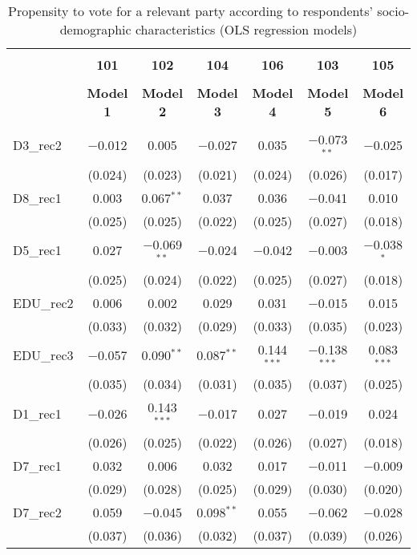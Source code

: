 \documentclass[
]{article}
\begin{document}
\begin{table}[!htbp] \centering 
  \caption{Propensity to vote for a relevant party according to respondents' 
                     socio-demographic characteristics (OLS regression models)} 
  \label{table:full_ols_at} 
\begin{tabular}{@{\extracolsep{5pt}}lcccccc} 
\\[-1.8ex]\hline \\[-1.8ex] 
 & \textbf{101} & \textbf{102} & \textbf{104} & \textbf{106} & \textbf{103} & \textbf{105} \\ 
\\[-1.8ex] & \textbf{Model 1} & \textbf{Model 2} & \textbf{Model 3} & \textbf{Model 4} & \textbf{Model 5} & \textbf{Model 6}\\ 
\hline \\[-1.8ex] 
 D3\_rec2 & $-$0.012 & 0.005 & $-$0.027 & 0.035 & $-$0.073$^{**}$ & $-$0.025 \\ 
  & (0.024) & (0.023) & (0.021) & (0.024) & (0.026) & (0.017) \\ 
  D8\_rec1 & 0.003 & 0.067$^{**}$ & 0.037 & 0.036 & $-$0.041 & 0.010 \\ 
  & (0.025) & (0.025) & (0.022) & (0.025) & (0.027) & (0.018) \\ 
  D5\_rec1 & 0.027 & $-$0.069$^{**}$ & $-$0.024 & $-$0.042 & $-$0.003 & $-$0.038$^{*}$ \\ 
  & (0.025) & (0.024) & (0.022) & (0.025) & (0.027) & (0.018) \\ 
  EDU\_rec2 & 0.006 & 0.002 & 0.029 & 0.031 & $-$0.015 & 0.015 \\ 
  & (0.033) & (0.032) & (0.029) & (0.033) & (0.035) & (0.023) \\ 
  EDU\_rec3 & $-$0.057 & 0.090$^{**}$ & 0.087$^{**}$ & 0.144$^{***}$ & $-$0.138$^{***}$ & 0.083$^{***}$ \\ 
  & (0.035) & (0.034) & (0.031) & (0.035) & (0.037) & (0.025) \\ 
  D1\_rec1 & $-$0.026 & 0.143$^{***}$ & $-$0.017 & 0.027 & $-$0.019 & 0.024 \\ 
  & (0.026) & (0.025) & (0.022) & (0.026) & (0.027) & (0.018) \\ 
  D7\_rec1 & 0.032 & 0.006 & 0.032 & 0.017 & $-$0.011 & $-$0.009 \\ 
  & (0.029) & (0.028) & (0.025) & (0.029) & (0.030) & (0.020) \\ 
  D7\_rec2 & 0.059 & $-$0.045 & 0.098$^{**}$ & 0.055 & $-$0.062 & $-$0.028 \\ 
  & (0.037) & (0.036) & (0.032) & (0.037) & (0.039) & (0.026) \\ 

\end{tabular}
\end{table}
\end{document}
